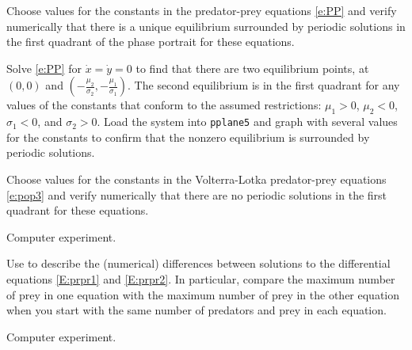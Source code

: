 \documentclass{ximera}
\begin{document}
\CEXER

\begin{exercise} \label{c9.1.3}
Choose values for the constants in the predator-prey equations 
\eqref{e:PP} and verify numerically that there is a unique 
equilibrium surrounded by periodic solutions in the first 
quadrant of the phase portrait for these equations.

\begin{solution}

Solve \eqref{e:PP} for $\dot{x} = \dot{y} = 0$ to find that there are
two equilibrium points, at $(0,0)$ and $(-\frac{\mu_2}{\sigma_2},
-\frac{\mu_1}{\sigma_1})$.  The second equilibrium is in the first
quadrant for any values of the constants that conform to the assumed
restrictions: $\mu_1 > 0$, $\mu_2 < 0$, $\sigma_1 < 0$, and
$\sigma_2 > 0$.  Load the system into {\tt pplane5} and graph with
several values for the constants to confirm that the nonzero
equilibrium is surrounded by periodic solutions.

\end{solution}
\end{exercise}

\begin{exercise} \label{c9.1.4}
Choose values for the constants in the Volterra-Lotka predator-prey equations 
\eqref{e:pop3} and verify numerically that there are no periodic solutions in 
the first quadrant for these equations.

\begin{solution}
Computer experiment.

\end{solution}
\end{exercise}

\begin{exercise} \label{c9.1.7}
Use {\pplane} to describe the (numerical) differences between solutions 
to the differential equations \eqref{E:prpr1} and \eqref{E:prpr2}.  In particular,
compare the maximum number of prey in one equation with the maximum number of 
prey in the other equation when you start with the same number of predators 
and prey in each equation.

\begin{solution}
Computer experiment.


\end{solution}
\end{exercise}
\end{document}
